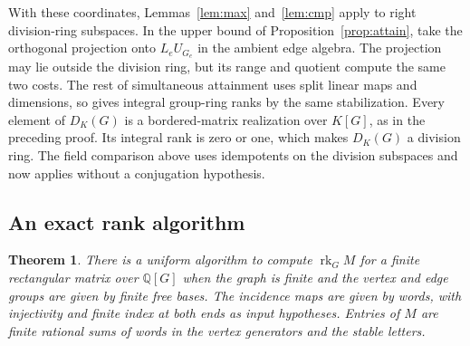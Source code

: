 \documentclass[11pt,a4paper,reqno]{amsart}
\numberwithin{equation}{section}
\newtheorem{theorem}{Theorem}[section]
\theoremstyle{remark}
\newcommand{\Q}{\mathbb Q}
\newcommand{\rk}{\operatorname{rk}}
\begin{document}
With these coordinates, Lemmas~\ref{lem:max} and~\ref{lem:cmp} apply to right division-ring subspaces. In the upper bound of Proposition~\ref{prop:attain}, take the orthogonal projection onto \(L_eU_{G_e}\) in the ambient edge algebra. The projection may lie outside the division ring, but its range and quotient compute the same two costs. The rest of simultaneous attainment uses split linear maps and dimensions, so gives integral group-ring ranks by the same stabilization. Every element of \(D_K(G)\) is a bordered-matrix realization over \(K[G]\), as in the preceding proof. Its integral rank is zero or one, which makes \(D_K(G)\) a division ring. The field comparison above uses idempotents on the division subspaces and now applies without a conjugation hypothesis.

\subsection{An exact rank algorithm}
\begin{theorem}\label{thm:sac-exact-rank}
There is a uniform algorithm to compute \(\rk_G M\) for a finite rectangular matrix over \(\Q[G]\) when the graph is finite and the vertex and edge groups are given by finite free bases. The incidence maps are given by words, with injectivity and finite index at both ends as input hypotheses. Entries of \(M\) are finite rational sums of words in the vertex generators and the stable letters.
\end{theorem}
\end{document}
